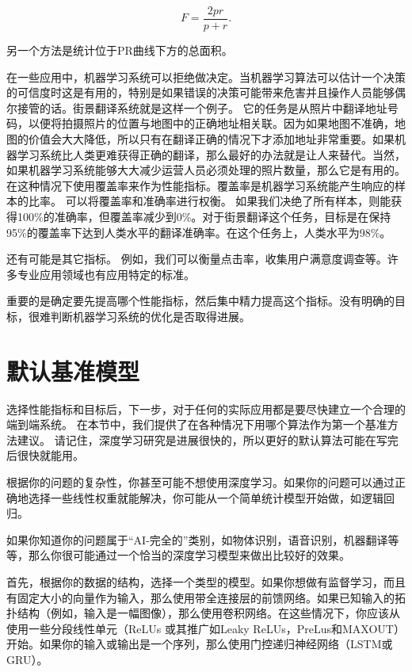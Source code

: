 \begin{equation}
        F = \frac{2pr}{p+r}.
\end{equation}

另一个方法是统计位于PR曲线下方的总面积。

在一些应用中，机器学习系统可以拒绝做决定。当机器学习算法可以估计一个决策的可信度时这是有用的，特别是如果错误的决策可能带来危害并且操作人员能够偶尔接管的话。街景翻译系统就是这样一个例子。 它的任务是从照片中翻译地址号码，以便将拍摄照片的位置与地图中的正确地址相关联。因为如果地图不准确，地图的价值会大大降低，所以只有在翻译正确的情况下才添加地址非常重要。如果机器学习系统比人类更难获得正确的翻译，那么最好的办法就是让人来替代。当然，如果机器学习系统能够大大减少运营人员必须处理的照片数量，那么它是有用的。在这种情况下使用覆盖率来作为性能指标。覆盖率是机器学习系统能产生响应的样本的比率。 可以将覆盖率和准确率进行权衡。 如果我们决绝了所有样本，则能获得100\%的准确率，但覆盖率减少到0\%。对于街景翻译这个任务，目标是在保持95\%的覆盖率下达到人类水平的翻译准确率。在这个任务上，人类水平为98\%。

还有可能是其它指标。 例如，我们可以衡量点击率，收集用户满意度调查等。许多专业应用领域也有应用特定的标准。

重要的是确定要先提高哪个性能指标，然后集中精力提高这个指标。没有明确的目标，很难判断机器学习系统的优化是否取得进展。


\section{默认基准模型}

选择性能指标和目标后，下一步，对于任何的实际应用都是要尽快建立一个合理的端到端系统。 在本节中，我们提供了在各种情况下用哪个算法作为第一个基准方法建议。 请记住，深度学习研究是进展很快的，所以更好的默认算法可能在写完后很快就能用。

根据你的问题的复杂性，你甚至可能不想使用深度学习。如果你的问题可以通过正确地选择一些线性权重就能解决，你可能从一个简单统计模型开始做，如逻辑回归。

如果你知道你的问题属于“AI-完全的”类别，如物体识别，语音识别，机器翻译等等，那么你很可能通过一个恰当的深度学习模型来做出比较好的效果。

首先，根据你的数据的结构，选择一个类型的模型。如果你想做有监督学习，而且有固定大小的向量作为输入，那么使用带全连接层的前馈网络。如果已知输入的拓扑结构（例如，输入是一幅图像），那么使用卷积网络。在这些情况下，你应该从使用一些分段线性单元（ReLUs 或其推广如Leaky ReLUs，PreLus和MAXOUT）开始。如果你的输入或输出是一个序列，那么使用门控递归神经网络（LSTM或GRU）。

